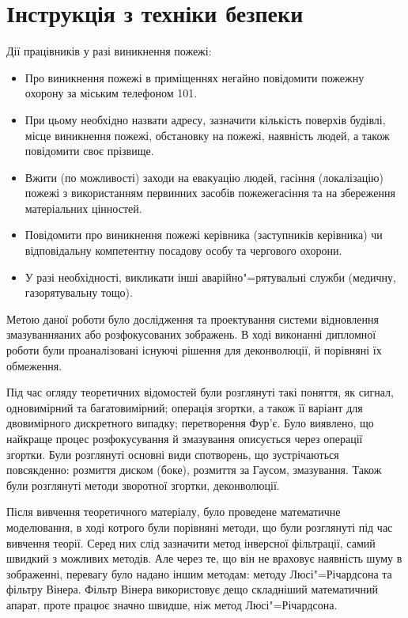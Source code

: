 \documentclass{diploma}
\begin{document}
  \section{Інструкція з техніки безпеки}
    Дії працівників у разі виникнення пожежі:
    \begin{itemize}
      \item Про виникнення пожежі в приміщеннях негайно повідомити пожежну
        охорону за міським телефоном 101.
      \item При цьому необхідно назвати адресу, зазначити кількість поверхів
        будівлі, місце виникнення пожежі, обстановку на пожежі, наявність
        людей, а також повідомити своє прізвище.
      \item Вжити (по можливості) заходи на евакуацію людей, гасіння
        (локалізацію) пожежі з використанням первинних засобів пожежегасіння
        та на збереження матеріальних цінностей.
      \item Повідомити про виникнення пожежі керівника (заступників керівника)
        чи відповідальну компетентну посадову особу та чергового охорони.
      \item У разі необхідності, викликати інші аварійно"=рятувальні служби
        (медичну, газорятувальну тощо).
    \end{itemize}

\conclusion
  Метою даної роботи було дослідження та проектування системи відновлення
  змазуванняаних або розфокусованих зображень.
  В ході виконанні дипломної роботи були проаналізовані існуючі рішення для
  деконволюції, й порівняні їх обмеження.

  Під час огляду теоретичних відомостей були розглянуті такі поняття, як
  сигнал, одновимірний та багатовимірний; операція згортки, а також її варіант
  для двовимірного дискретного випадку; перетворення Фур’є.
  Було виявлено, що найкраще процес розфокусування й змазування описується
  через операції згортки.
  Були розглянуті основні види спотворень, що зустрічаються повсякденно:
  розмиття диском (боке), розмиття за Гаусом, змазування.
  Також були розглянуті методи зворотної згортки, деконволюції.

  Після вивчення теоретичного матеріалу, було проведене математичне
  моделювання, в ході котрого були порівняні методи, що були розглянуті під
  час вивчення теорії.
  Серед них слід зазначити метод інверсної фільтрації, самий швидкий з
  можливих методів.
  Але через те, що він не враховує наявність шуму в зображенні, перевагу було
  надано іншим методам: методу Люсі"=Річардсона та фільтру Вінера.
  Фільтр Вінера використовує дещо складніший математичний апарат, проте працює
  значно швидше, ніж метод Люсі"=Річардсона.
\end{document}

